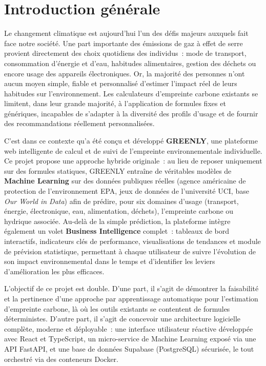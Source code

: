 \chapter*{Introduction générale}

Le changement climatique est aujourd'hui l'un des défis majeurs auxquels fait face notre société. Une part importante des émissions de gaz à effet de serre provient directement des choix quotidiens des individus~: mode de transport, consommation d'énergie et d'eau, habitudes alimentaires, gestion des déchets ou encore usage des appareils électroniques. Or, la majorité des personnes n'ont aucun moyen simple, fiable et personnalisé d'estimer l'impact réel de leurs habitudes sur l'environnement. Les calculateurs d'empreinte carbone existants se limitent, dans leur grande majorité, à l'application de formules fixes et génériques, incapables de s'adapter à la diversité des profils d'usage et de fournir des recommandations réellement personnalisées.

C'est dans ce contexte qu'a été conçu et développé \textbf{GREENLY}, une plateforme web intelligente de calcul et de suivi de l'empreinte environnementale individuelle. Ce projet propose une approche hybride originale~: au lieu de reposer uniquement sur des formules statiques, GREENLY entraîne de véritables modèles de \textbf{Machine Learning} sur des données publiques réelles (agence américaine de protection de l'environnement EPA, jeux de données de l'université UCI, base \textit{Our World in Data}) afin de prédire, pour six domaines d'usage (transport, énergie, électronique, eau, alimentation, déchets), l'empreinte carbone ou hydrique associée. Au-delà de la simple prédiction, la plateforme intègre également un volet \textbf{Business Intelligence} complet~: tableaux de bord interactifs, indicateurs clés de performance, visualisations de tendances et module de prévision statistique, permettant à chaque utilisateur de suivre l'évolution de son impact environnemental dans le temps et d'identifier les leviers d'amélioration les plus efficaces.

L'objectif de ce projet est double. D'une part, il s'agit de démontrer la faisabilité et la pertinence d'une approche par apprentissage automatique pour l'estimation d'empreinte carbone, là où les outils existants se contentent de formules déterministes. D'autre part, il s'agit de concevoir une architecture logicielle complète, moderne et déployable~: une interface utilisateur réactive développée avec React et TypeScript, un micro-service de Machine Learning exposé via une API FastAPI, et une base de données Supabase (PostgreSQL) sécurisée, le tout orchestré via des conteneurs Docker.

